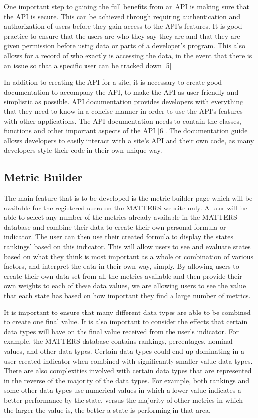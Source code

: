 One important step to gaining the full benefits from an API is making sure that the API is secure. This can be achieved through requiring authentication and authorization of users before they gain access to the API’s features. It is good practice to ensure that the users are who they say they are and that they are given permission before using data or parts of a developer’s program. This also allows for a record of who exactly is accessing the data, in the event that there is an issue so that a specific user can be tracked down [5].

In addition to creating the API for a site, it is necessary to create good documentation to accompany the API, to make the API as user friendly and simplistic as possible. API documentation provides developers with everything that they need to know in a concise manner in order to use the API’s features with other applications. The API documentation needs to contain the classes, functions and other important aspects of the API [6]. The documentation guide allows developers to easily interact with a site’s API and their own code, as many developers style their code in their own unique way. 

\subsection{Metric Builder}

The main feature that is to be developed is the metric builder page which will be available for the registered users on the MATTERS website only. A user will be able to select any number of the metrics already available in the MATTERS database and combine their data to create their own personal formula or indicator. The user can then use their created formula to display the states rankings’ based on this indicator. This will allow users to see and evaluate states based on what they think is most important as a whole or combination of various factors, and interpret the data in their own way, simply. By allowing users to create their own data set from all the metrics available and then provide their own weights to each of these data values, we are allowing users to see the value that each state has based on how important they find a large number of metrics.

It is important to ensure that many different data types are able to be combined to create one final value. It is also important to consider the effects that certain data types will have on the final value received from the user’s indicator. For example, the MATTERS database contains rankings, percentages, nominal values, and other data types. Certain data types could end up dominating in a user created indicator when combined with significantly smaller value data types. There are also complexities involved with certain data types that are represented in the reverse of the majority of the data types. For example, both rankings and some other data types use numerical values in which a lower value indicates a better performance by the state, versus the majority of other metrics in which the larger the value is, the better a state is performing in that area. 

